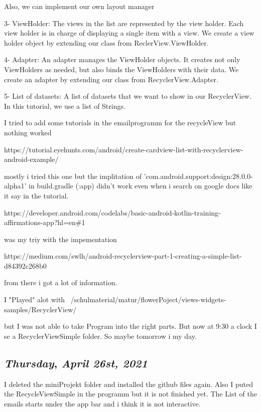 Also, we can implement our own layout manager

3- ViewHolder: The views in the list are represented by the view holder. Each view holder is in charge of displaying a single item with a view. We create a view holder object by extending our class from ReclerView.ViewHolder.

4- Adapter: An adapter manages the ViewHolder objects. It creates not only ViewHolders as needed, but also binds the ViewHolders with their data. We create an adapter by extending our class from RecyclerView.Adapter.

5- List of datasets: A list of datasets that we want to show in our RecyclerView. In this tutorial, we use a list of Strings.

I tried to add some tutorials in the emailprogramm for the recycleView but nothing worked

https://tutorial.eyehunts.com/android/create-cardview-list-with-recyclerview-android-example/

mostly i tried this one but the implitation of 'com.android.support:design:28.0.0-alpha1' in build.gradle (:app) didn't work even when i search on google docs like it say in the tutorial.

https://developer.android.com/codelabs/basic-android-kotlin-training-affirmations-app?hl=en\#1

was my triy with the impementation

https://medium.com/swlh/android-recyclerview-part-1-creating-a-simple-list-d84392c268b0

from there i got a lot of information. 

I "Played" alot with ~/schulmaterial/matur/flowerPoject/views-widgets-samples/RecyclerView/

but I was not able to take Program into the right parts. But now at 9:30 a clock I se a RecyclerViewSimple folder. So maybe tomorrow i my day. 



\def\day{\textit{April 26st, 2021}}
\def\weekday{\textit{Thursday}}
\subsection*{\weekday, \day}

I deleted the miniProjekt folder and installed the github files again.
Also I puted the RecycleViewSimple in the programm but it is not finished yet. 
The List of the emails starts under the app bar and i think it is not interactive. 










